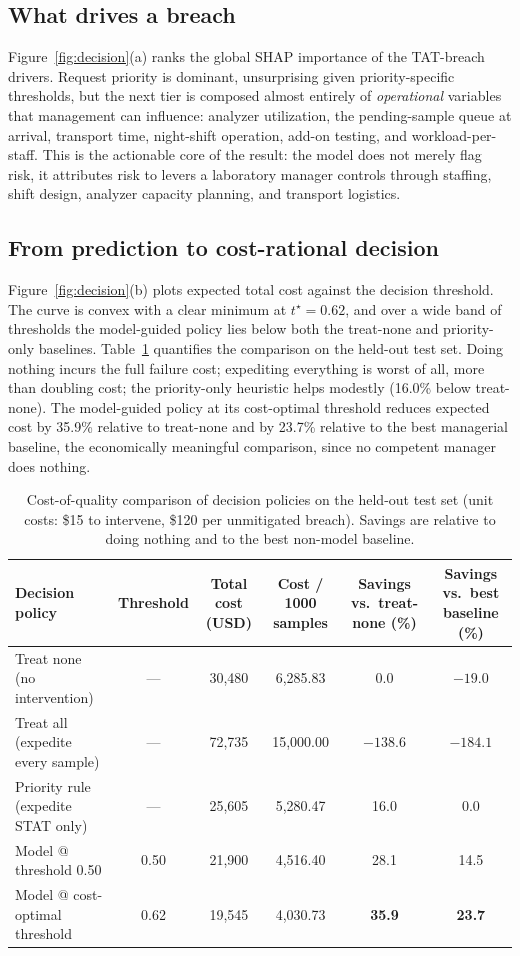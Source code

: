 \documentclass[journal]{IEEEtran}
\begin{document}
\subsection{What drives a breach}
Figure~\ref{fig:decision}(a) ranks the global SHAP importance of the TAT-breach
drivers. Request priority is dominant, unsurprising given priority-specific
thresholds, but the next tier is composed almost entirely of \emph{operational}
variables that management can influence: analyzer utilization, the pending-sample
queue at arrival, transport time, night-shift operation, add-on testing, and
workload-per-staff. This is the actionable core of the result: the model does not
merely flag risk, it attributes risk to levers a laboratory manager controls
through staffing, shift design, analyzer capacity planning, and transport
logistics.

\subsection{From prediction to cost-rational decision}
Figure~\ref{fig:decision}(b) plots expected total cost against the decision
threshold. The curve is convex with a clear minimum at $t^{\star}=0.62$, and over a
wide band of thresholds the model-guided policy lies below both the treat-none and
priority-only baselines. Table~\ref{tab:cost} quantifies the comparison on the
held-out test set. Doing nothing incurs the full failure cost; expediting
everything is worst of all, more than doubling cost; the priority-only heuristic
helps modestly (16.0\% below treat-none). The model-guided policy at its
cost-optimal threshold reduces expected cost by 35.9\% relative to treat-none and
by 23.7\% relative to the best managerial baseline, the economically meaningful
comparison, since no competent manager does nothing.

\begin{table}[!t]
\centering
\caption{Cost-of-quality comparison of decision policies on the held-out test set
(unit costs: \$15 to intervene, \$120 per unmitigated breach). Savings are
relative to doing nothing and to the best non-model baseline.}
\label{tab:cost}
\begin{tabular}{lccccc}
\toprule
Decision policy & Threshold & Total cost (USD) & Cost / 1000 samples & Savings vs.\ treat-none (\%) & Savings vs.\ best baseline (\%) \\
\midrule
Treat none (no intervention) & --- & 30{,}480 & 6{,}285.83 & 0.0 & $-19.0$ \\
Treat all (expedite every sample) & --- & 72{,}735 & 15{,}000.00 & $-138.6$ & $-184.1$ \\
Priority rule (expedite STAT only) & --- & 25{,}605 & 5{,}280.47 & 16.0 & 0.0 \\
Model @ threshold 0.50 & 0.50 & 21{,}900 & 4{,}516.40 & 28.1 & 14.5 \\
Model @ cost-optimal threshold & 0.62 & 19{,}545 & 4{,}030.73 & \textbf{35.9} & \textbf{23.7} \\
\bottomrule
\end{tabular}
\end{table}
\end{document}
